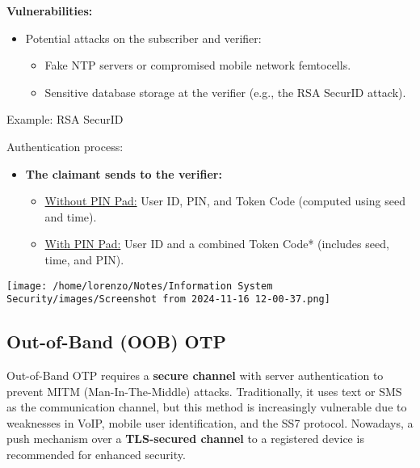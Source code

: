 \begin{customquote}
    \textbf{Vulnerabilities:}
    \begin{itemize}
        \item Potential attacks on the subscriber and verifier:
        \begin{itemize}
            \item Fake NTP servers or compromised mobile network femtocells.
            \item Sensitive database storage at the verifier (e.g., the RSA SecurID attack).
        \end{itemize}
    \end{itemize}
\end{customquote}

\begin{quotebox}[colframe=blue!10!white, colback=blue!5!white]{Example: RSA SecurID}
    \begin{minipage}{0.6\textwidth}
        Authentication process:
        \begin{itemize}
            \item \textbf{The claimant sends to the verifier:}
            \begin{itemize}
                \item \underline{Without PIN Pad:} User ID, PIN, and Token Code (computed using seed and time).
                \item \underline{With PIN Pad:} User ID and a combined Token Code* (includes seed, time, and PIN).
            \end{itemize}
        \end{itemize}
    \end{minipage} 
    \hspace{1cm}
    \begin{minipage}{0.3\textwidth}
        \centering
        \texttt{[image: /home/lorenzo/Notes/Information System Security/images/Screenshot from 2024-11-16 12-00-37.png]}
    \end{minipage}
\end{quotebox}

\subsection{Out-of-Band (OOB) OTP}
Out-of-Band OTP requires a \textbf{secure channel} with server authentication 
to prevent MITM (Man-In-The-Middle) attacks. Traditionally, it uses text or 
SMS as the communication channel, but this method is increasingly vulnerable 
due to weaknesses in VoIP, mobile user identification, and the SS7 protocol. 
Nowadays, a push mechanism over a \textbf{TLS-secured channel} to a registered device is recommended for enhanced security.


